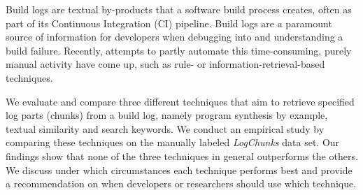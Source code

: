 
Build logs are textual by-products that a software build process
creates, often as part of its Continuous Integration (CI)
pipeline. Build logs are a paramount source of information for
developers when debugging into and understanding a build
failure. Recently, attempts to partly automate this time-consuming,
purely manual activity have come up, such as rule- or
information-retrieval-based techniques.

We evaluate and compare three different techniques that aim to retrieve
specified log parts (chunks) from a build log, namely program synthesis
by example, textual similarity and search keywords.
We conduct an empirical study by comparing these techniques on the manually
labeled \emph{LogChunks} data set.
Our findings show that none of the three techniques in general outperforms
the others. We discuss under which circumstances each technique performs best
and provide a recommendation on when developers or researchers should use which
technique.

